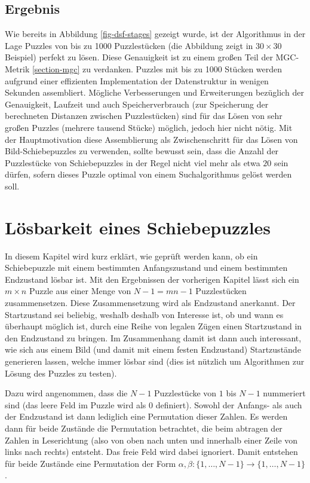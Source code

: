 \documentclass{whswinvcbook}
\begin{document}
\section{Ergebnis}
Wie bereits in Abbildung \ref{fig-dsf-stages} gezeigt wurde, ist der Algorithmus in der Lage Puzzles von bis zu 1000 Puzzlestücken (die Abbildung zeigt in $30\times30$ Beispiel) perfekt zu lösen. Diese Genauigkeit ist zu einem großen Teil der MGC-Metrik \ref{section-mgc} zu verdanken. Puzzles mit bis zu 1000 Stücken werden aufgrund einer effizienten Implementation der Datenstruktur in wenigen Sekunden assembliert. Mögliche Verbesserungen und Erweiterungen bezüglich der Genauigkeit, Laufzeit und auch Speicherverbrauch (zur Speicherung der berechneten Distanzen zwischen Puzzlestücken) sind für das Lösen von sehr großen Puzzles (mehrere tausend Stücke) möglich, jedoch hier nicht nötig. Mit der Hauptmotivation diese Assemblierung als Zwischenschritt für das Lösen von Bild-Schiebepuzzles zu verwenden, sollte bewusst sein, dass die Anzahl der Puzzlestücke von Schiebepuzzles in der Regel nicht viel mehr als etwa $20$ sein dürfen, sofern dieses Puzzle optimal von einem Suchalgorithmus gelöst werden soll.
\chapter{Lösbarkeit eines Schiebepuzzles}\label{ch-perm}
In diesem Kapitel wird kurz erklärt, wie geprüft werden kann, ob ein Schiebepuzzle mit einem bestimmten Anfangszustand und einem bestimmten Endzustand lösbar ist. Mit den Ergebnissen der vorherigen Kapitel lässt sich ein $m\times n$ Puzzle aus einer Menge von $N-1=mn-1$ Puzzlestücken zusammensetzen. Diese Zusammensetzung wird als Endzustand anerkannt. Der Startzustand sei beliebig, weshalb deshalb von Interesse ist, ob und wann es überhaupt möglich ist, durch eine Reihe von legalen Zügen einen Startzustand in den Endzustand zu bringen. Im Zusammenhang damit ist dann auch interessant, wie sich aus einem Bild (und damit mit einem festen Endzustand) Startzustände generieren lassen, welche immer lösbar sind (dies ist nützlich um Algorithmen zur Lösung des Puzzles zu testen).

Dazu wird angenommen, dass die $N-1$ Puzzlestücke von $1$ bis $N-1$ nummeriert sind (das leere Feld im Puzzle wird als $0$ definiert). Sowohl der Anfangs- als auch der Endzustand ist dann lediglich eine Permutation dieser Zahlen. Es werden dann für beide Zustände die Permutation betrachtet, die beim abtragen der Zahlen in Leserichtung (also von oben nach unten und innerhalb einer Zeile von links nach rechts) entsteht. Das freie Feld wird dabei ignoriert. Damit entstehen für beide Zustände eine Permutation der Form $\alpha,\beta:\{1,\dots,N-1\}\longrightarrow\{1,\dots,N-1\}$.
\end{document}
